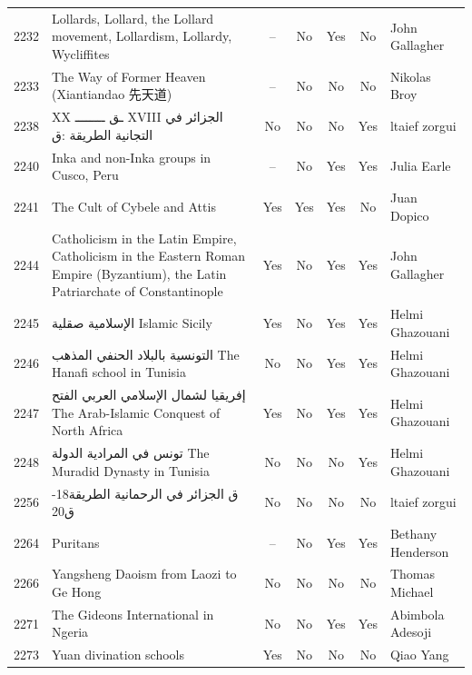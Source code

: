 {\begin{longtable}{rp{3.5cm}ccccp{3cm}}
2232 & {\raggedright Lollards, Lollard, the Lollard movement, Lollardism,  Lollardy, Wycliffites} & -- & No & Yes & No & {\raggedright John Gallagher} \\
2233 & {\raggedright The Way of Former Heaven (Xiantiandao 先天道)} & -- & No & No & No & {\raggedright Nikolas Broy} \\
2238 & {\raggedright XX {\arabicfont ـق    ــــــــ}  XVIII   {\arabicfont الجزائر في التجانية الطريقة} :{\arabicfont ق}} & No & No & No & Yes & {\raggedright ltaief zorgui} \\
2240 & {\raggedright Inka and non-Inka groups in Cusco, Peru} & -- & No & Yes & Yes & {\raggedright Julia Earle} \\
2241 & {\raggedright The Cult of Cybele and Attis} & Yes & Yes & Yes & No & {\raggedright Juan Dopico} \\
2244 & {\raggedright Catholicism in the Latin Empire, Catholicism in the Eastern Roman Empire (Byzantium), the Latin Patriarchate of Constantinople} & Yes & No & Yes & Yes & {\raggedright John Gallagher} \\
2245 & {\raggedright {\arabicfont الإسلامية صقلية} Islamic Sicily} & Yes & No & Yes & Yes & {\raggedright Helmi Ghazouani} \\
2246 & {\raggedright {\arabicfont التونسية بالبلاد الحنفي المذهب} The Hanafi school in Tunisia} & No & No & Yes & Yes & {\raggedright Helmi Ghazouani} \\
2247 & {\raggedright {\arabicfont إفريقيا لشمال الإسلامي العربي الفتح} The Arab-Islamic Conquest of North Africa} & Yes & No & Yes & Yes & {\raggedright Helmi Ghazouani} \\
2248 & {\raggedright {\arabicfont تونس في المرادية الدولة} The Muradid Dynasty in Tunisia} & No & No & No & Yes & {\raggedright Helmi Ghazouani} \\
2256 & {\raggedright {\arabicfont ق  الجزائر في الرحمانية الطريقة}18-{\arabicfont ق}20} & No & No & No & No & {\raggedright ltaief zorgui} \\
2264 & {\raggedright Puritans} & -- & No & Yes & Yes & {\raggedright Bethany Henderson} \\
2266 & {\raggedright Yangsheng Daoism from Laozi to Ge Hong} & No & No & No & No & {\raggedright Thomas Michael} \\
2271 & {\raggedright The Gideons International in Ngeria} & No & No & Yes & Yes & {\raggedright Abimbola Adesoji} \\
2273 & {\raggedright Yuan divination schools} & Yes & No & No & No & {\raggedright Qiao Yang} \\

\end{longtable}}

